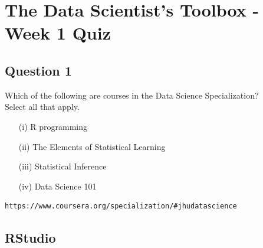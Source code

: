 \documentclass[12pt]{article}
\begin{document}
\section*{The Data Scientist’s Toolbox - Week 1 Quiz}




\newpage
\subsection*{Question 1}

Which of the following are courses in the Data Science Specialization? \\ Select all that apply.
\begin{itemize}
\item[(i)] R programming 

\item[(ii)] The Elements of Statistical Learning 

\item[(iii)] Statistical Inference 

\item[(iv)] Data Science 101 
\end{itemize}

\bigskip
\begin{verbatim}
https://www.coursera.org/specialization/#jhudatascience
\end{verbatim}
\newpage
\subsection*{RStudio}
\end{document}
